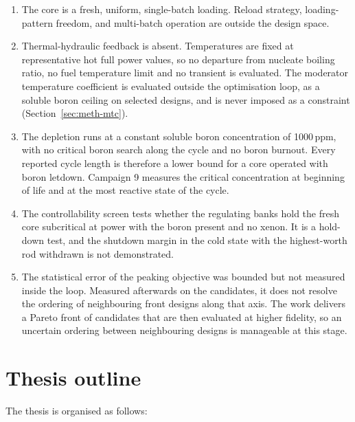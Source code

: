 \begin{enumerate}
  \item The core is a fresh, uniform, single-batch loading. Reload
        strategy, loading-pattern freedom, and multi-batch operation are
        outside the design space.

  \item Thermal-hydraulic feedback is absent. Temperatures are fixed at
        representative hot full power values, so no departure from
        nucleate boiling ratio, no fuel temperature limit and no
        transient is evaluated. The moderator temperature coefficient
        is evaluated outside the optimisation loop, as a soluble boron
        ceiling on selected designs, and is never imposed as a
        constraint (Section~\ref{sec:meth-mtc}).

  \item The depletion runs at a constant soluble boron concentration of
        1000\,ppm, with no critical boron search along the cycle and no
        boron burnout. Every reported cycle length is therefore a lower
        bound for a core operated with boron letdown. Campaign 9
        measures the critical concentration at beginning of life and at
        the most reactive state of the cycle.

  \item The controllability screen tests whether the regulating banks
        hold the fresh core subcritical at power with the boron present
        and no xenon. It is a hold-down test, and the shutdown margin
        in the cold state with the highest-worth rod withdrawn is not
        demonstrated.

  \item The statistical error of the peaking objective was bounded but
        not measured inside the loop. Measured afterwards on the
        candidates, it does not resolve the ordering of neighbouring
        front designs along that axis. The work delivers a Pareto front
        of candidates that are then evaluated at higher fidelity, so an
        uncertain ordering between neighbouring designs is manageable at
        this stage.
\end{enumerate}

\section{Thesis outline}
\label{sec:intro-outline}

The thesis is organised as follows:

